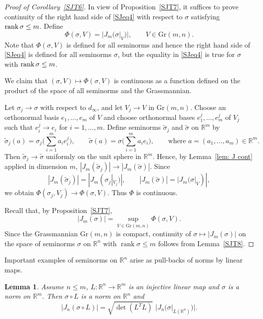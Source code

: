 \documentclass[12pt,leqno]{amsart}
\newtheorem{lemma}[theorem]{Lemma}
\theoremstyle{definition}
\newcommand{\bbbr}{\mathbb R}
\def\rank{{\rm rank\,}}
\numberwithin{theorem}{section} \numberwithin{equation}{section}
\begin{document}
\begin{proof}[Proof of Corollary~\ref{SJT6}]
In view of Proposition~\ref{SJT7}, it suffices to prove continuity of the right hand side of \eqref{SJeq4} with respect to $\sigma$ satisfying $\rank\sigma\leq m$. Define
\[
\Phi(\sigma,V)=|J_m(\sigma|_V)|,
\qquad V\in \mathrm{Gr}(m,n).
\]
Note that $\Phi(\sigma,V)$ is defined for all seminorms and hence the right hand side of \eqref{SJeq4} is defined for all seminorms $\sigma$, but the equality in \eqref{SJeq4} is true for $\sigma$ with $\rank\sigma\leq m$.

We claim that $(\sigma,V)\mapsto\Phi(\sigma,V)$ is continuous as a function defined on the product of the space of all seminorms and the Grassmannian.

Let $\sigma_j\to \sigma$ with respect to $d_\infty$, and let
$V_j\to V$ in $\mathrm{Gr}(m,n)$. Choose an orthonormal basis
$e_1,\ldots,e_m$ of $V$
and choose orthonormal bases
$e_1^j,\ldots,e_m^j$ of $V_j$ such that
$e_i^j\to e_i$ for $i=1,\ldots,m$.
Define seminorms $\widetilde\sigma_j$ and $\widetilde\sigma$ on
$\mathbb{R}^m$ by
\[
\widetilde\sigma_j(a)
=
\sigma_j\Big(\sum_{i=1}^m a_i e_i^j\Big),
\qquad
\widetilde\sigma(a)
=
\sigma\Big(\sum_{i=1}^m a_i e_i\Big),
\qquad
\text{where } a=(a_1,\ldots,a_m)\in\mathbb{R}^m.
\]
Then
$\widetilde\sigma_j\to\widetilde\sigma$
uniformly on the unit sphere in $\mathbb{R}^m$. Hence, by Lemma~\ref{lem: J cont} applied in dimension $m$,
$|J_m(\widetilde\sigma_j)|\to |J_m(\widetilde\sigma)|$.
Since
\[
|J_m(\widetilde\sigma_j)|=|J_m(\sigma_j|_{V_j})|,
\qquad
|J_m(\widetilde\sigma)|=|J_m(\sigma|_V)|,
\]
we obtain $\Phi(\sigma_j,V_j)\to \Phi(\sigma,V)$. Thus $\Phi$ is continuous.

Recall that, by Proposition~\ref{SJT7},
$$
|J_m(\sigma)|=\sup_{V\in \mathrm{Gr}(m,n)} \Phi(\sigma,V).
$$
Since the Grassmannian $\mathrm{Gr}(m,n)$ is compact, continuity of $\sigma\mapsto |J_m(\sigma)|$
on the space of seminorms $\sigma$ on $\mathbb{R}^n$ with $\operatorname{rank}\sigma\leq m$ follows from Lemma~\ref{SJT8}.
\end{proof}

Important examples of seminorms on $\bbbr^n$ arise as pull-backs of norms by linear maps.

\begin{lemma}
\label{SJT5}
Assume $n\leq m$, $L:\bbbr^n\to\bbbr^m$ is an injective linear map and $\sigma$ is a norm on $\bbbr^m$. Then $\sigma\circ L$ is a norm on $\bbbr^n$ and
\begin{equation}
\label{eq:pullsemi}
|J_n(\sigma\circ L)|=\sqrt{\det(L^T L)}\,\,|J_n(\sigma|_{L(\bbbr^n)})|.
\end{equation}
\end{lemma}
\end{document}
